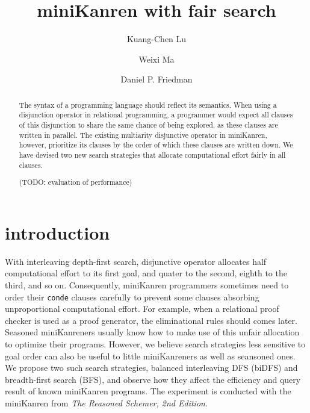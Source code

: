 \documentclass[format=acmlarge, review=true, authordraft=true]{acmart}
\title{miniKanren with fair search}
\author{Kuang-Chen Lu}
\affiliation{Indiana University}
\author{Weixi Ma}
\affiliation{Indiana University}
\author{Daniel P. Friedman}
\affiliation{Indiana University}
\begin{document}
\begin{abstract}

The syntax of a programming language should reflect its semantics.
When using a disjunction operator in relational programming, a programmer would
expect all clauses of this disjunction to share the same chance of being explored,
as these clauses are written in parallel. 
The existing multiarity disjunctive operator in miniKanren, however, prioritize its clauses
by the order of which these clauses are written down. 
We have devised two new search strategies that allocate computational effort fairly in all clauses.

(TODO: evaluation of performance)



\end{abstract}

\maketitle

\section{introduction}

With interleaving depth-first search, disjunctive operator allocates half computational effort to its first goal, and quater to the second, eighth to the third, and so on. Consequently, miniKanren programmers sometimes need to order their \texttt{conde} clauses carefully to prevent some clauses absorbing unproportional computational effort. For example, when a relational proof checker is used as a proof generator, the eliminational rules should comes later.
Seasoned miniKanreners usually know how to make use of this unfair allocation to optimize their programs. However, we believe search strategies less sensitive to goal order can also be useful to little miniKanreners as well as seansoned ones. We propose two such search strategies, balanced interleaving DFS (biDFS) and breadth-first search (BFS), and observe how they affect the efficiency and query result of known miniKanren programs. The experiment is conducted with the miniKanren from \textit{The Reasoned Schemer, 2nd Edition}.
\end{document}
